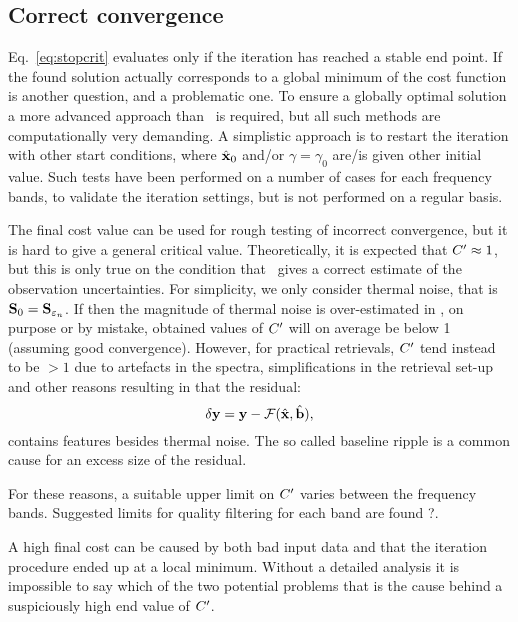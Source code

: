 \subsection{Correct convergence}
%
Eq.~\ref{eq:stopcrit} evaluates only if the iteration has reached a stable end
point. If the found solution actually corresponds to a global minimum of the
cost function is another question, and a problematic one. To ensure a globally
optimal solution a more advanced approach than \LM\ is required, but all
such methods are computationally very demanding. A simplistic approach is to
restart the iteration with other start conditions, where $\hat{\mathbf{x}}_0$ and/or
$\gamma=\gamma_0$ are/is given other initial value. Such tests have been
performed on a number of cases for each frequency bands, to validate the
iteration settings, but is not performed on a regular basis.

The final cost value can be used for rough testing of incorrect convergence,
but it is hard to give a general critical value. Theoretically, it is expected
that $C'\approx1$, but this is only true on the condition that
\ gives a correct estimate of the observation uncertainties. For
simplicity, we only consider thermal noise, that is
$\mathbf{S}_{0}=\mathbf{S}_{\varepsilon_n}$. If then the magnitude of thermal noise is
over-estimated in , on purpose or by mistake, obtained values of
$C'$  will on average be below 1 (assuming good convergence). However, for
practical retrievals, $C'$ tend instead to be $>1$ due to artefacts in
the spectra, simplifications in the retrieval set-up and other reasons
resulting in that the residual:
\begin{equation}
  \label{eq:dy}
  \delta\mathbf{y} = \mathbf{y}-\mathcal{F}(\hat{\mathbf{x}},\hat{\mathbf{b}}),
\end{equation}
contains features besides thermal noise. The so called baseline ripple is a common
cause for an excess size of the residual.

For these reasons, a suitable upper limit on $C'$ varies between the
frequency bands. Suggested limits for quality filtering for each band are found
?. 

A high final cost can be caused by both bad input data and that the iteration
procedure ended up at a local minimum. Without a detailed analysis it is
impossible to say which of the two potential problems that is the cause behind
a suspiciously high end value of $C'$.
\\


